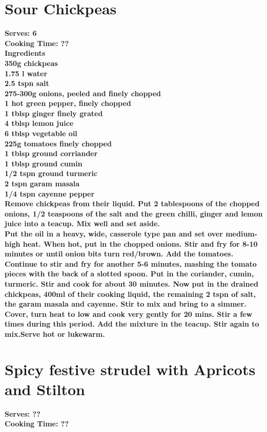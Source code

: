 \documentclass[18pt, oneside]{book}
\begin{document}
\section{Sour Chickpeas}
\bf{Serves: 6} \\
\bf{Cooking Time: ??} \\

\bf{Ingredients} \normalfont \\
350g chickpeas \\
1.75 l water \\
2.5 tspn salt \\
275-300g onions, peeled and finely chopped \\
1 hot green pepper, finely chopped \\
1 tblsp ginger finely grated \\
4 tblsp lemon juice \\
6 tblsp vegetable oil \\
225g tomatoes finely chopped \\
1 tblsp ground corriander \\
1 tblsp ground cumin \\
1/2 tspn ground turmeric \\
2 tspn garam masala \\
1/4 tspn cayenne pepper \\

Remove chickpeas from their liquid. Put 2 tablespoons of the chopped onions, 1/2 teaspoons of the salt and the green chilli, ginger and lemon juice into a teacup. Mix well and set aside. \\

Put the oil in a heavy, wide, casserole type pan and set over medium-high heat. When hot, put in the chopped onions. Stir and fry for 8-10 minutes or until onion bits turn red/brown. Add the tomatoes. Continue to stir and fry for another 5-6 minutes, mashing the tomato pieces with the back of a slotted spoon. Put in the coriander, cumin, turmeric. Stir and cook for about 30 minutes. Now put in the drained chickpeas, 400ml of their cooking liquid, the remaining 2 tspn of salt, the garam masala and cayenne. Stir to mix and bring to a simmer. Cover, turn heat to low and cook very gently for 20 mins. Stir a few times during this period. Add the mixture in the teacup. Stir again to mix.Serve hot or lukewarm. 




\section{Spicy festive strudel with Apricots and Stilton}
\bf{Serves: ??} \\
\bf{Cooking Time: ??} \\
\end{document}
